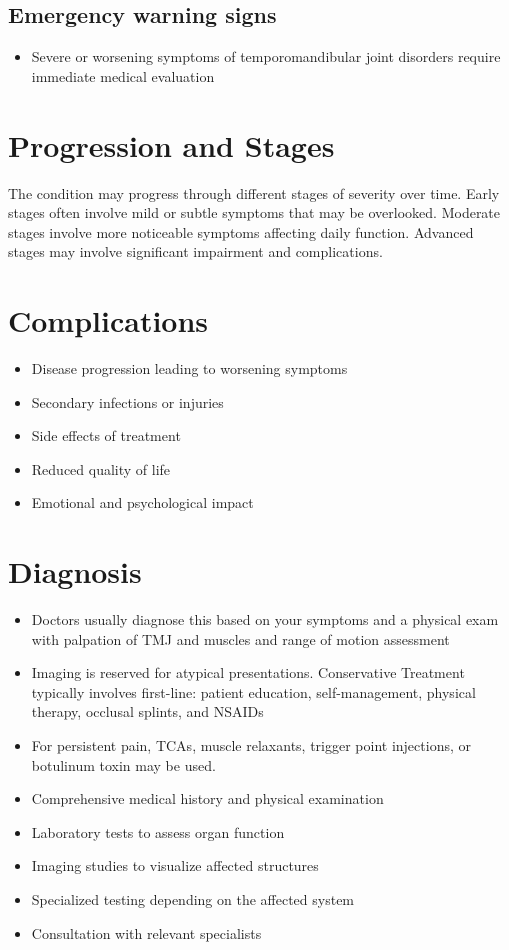 \subsection{Emergency warning signs}
\begin{itemize}[noitemsep]
  \item Severe or worsening symptoms of temporomandibular joint disorders require immediate medical evaluation
\end{itemize}
\section{Progression and Stages}
The condition may progress through different stages of severity over time. Early stages often involve mild or subtle symptoms that may be overlooked. Moderate stages involve more noticeable symptoms affecting daily function. Advanced stages may involve significant impairment and complications.
\section{Complications}
\begin{itemize}[noitemsep]
  \item Disease progression leading to worsening symptoms
  \item Secondary infections or injuries
  \item Side effects of treatment
  \item Reduced quality of life
  \item Emotional and psychological impact
\end{itemize}
\section{Diagnosis}
\begin{itemize}[noitemsep]
  \item Doctors usually diagnose this based on your symptoms and a physical exam with palpation of TMJ and muscles and range of motion assessment
  \item Imaging is reserved for atypical presentations. Conservative Treatment typically involves first-line: patient education, self-management, physical therapy, occlusal splints, and NSAIDs
  \item For persistent pain, TCAs, muscle relaxants, trigger point injections, or botulinum toxin may be used.
  \item Comprehensive medical history and physical examination
  \item Laboratory tests to assess organ function
  \item Imaging studies to visualize affected structures
  \item Specialized testing depending on the affected system
  \item Consultation with relevant specialists
\end{itemize}
